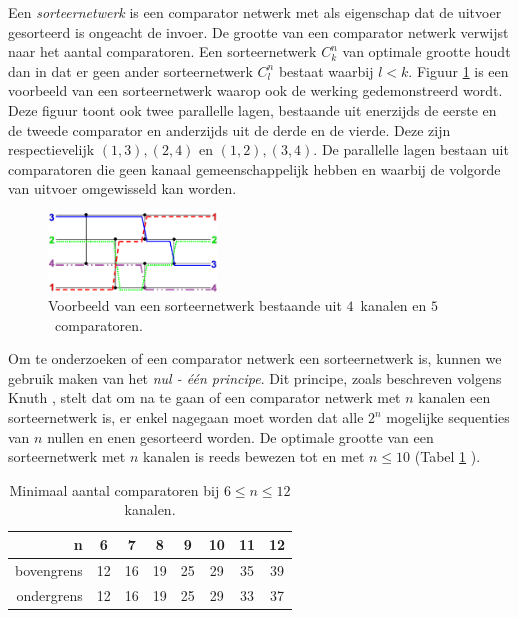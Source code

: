 \documentclass{article}
\begin{document}
Een \textit{sorteernetwerk} is een comparator netwerk met als eigenschap dat de uitvoer gesorteerd is ongeacht de invoer.
De grootte van een comparator netwerk verwijst naar het aantal comparatoren. 
Een sorteernetwerk $C^n_k$ van optimale grootte houdt dan in dat er geen ander sorteernetwerk $C^n_l$ bestaat waarbij $l < k$.
Figuur \ref{Werking} is een voorbeeld van een sorteernetwerk waarop ook de werking gedemonstreerd wordt.
Deze figuur toont ook twee parallelle lagen, bestaande uit enerzijds de eerste en de tweede comparator en anderzijds uit de derde en de vierde.
Deze zijn respectievelijk $(1,3), (2,4)$ en $(1,2), (3,4)$.
De parallelle lagen bestaan uit comparatoren die geen kanaal gemeenschappelijk hebben en waarbij de volgorde van uitvoer omgewisseld kan worden.
\begin{figure}[!h]
	\centering
	\includegraphics[width=0.4\textwidth]{NetworkTransparent.png} 
	\caption{Voorbeeld van een sorteernetwerk bestaande uit $4$~kanalen en $5$~comparatoren.}
	\label{Werking}
\end{figure}

Om te onderzoeken of een comparator netwerk een sorteernetwerk is, kunnen we gebruik maken van het \textit{nul - \'e\'en principe}. 
Dit principe, zoals beschreven volgens Knuth \cite{Knuth3}, stelt dat om na te gaan of een comparator netwerk met $n$ kanalen een sorteernetwerk is, er enkel nagegaan moet worden dat alle $2^n$ mogelijke sequenties van $n$ nullen en enen gesorteerd worden.
De optimale grootte van een sorteernetwerk met $n$ kanalen is reeds bewezen tot en met $n \leq 10$ (Tabel \ref{tabel1} \cite{sortingNetworksSize2014}).
\begin{table}[h!]
	\centering
	\begin{tabular}{r|c|c|c|c|c|c|c}
	n & 6 & 7 & 8 & 9 & 10 & 11 & 12\\ 
	\hline 
	bovengrens & 12 & 16 & 19 & 25 & 29 & 35 & 39\\ 
	\hline 
	ondergrens & 12 & 16 & 19 & 25& 29 & 33 & 37\\
	\end{tabular} 
	\caption{Minimaal aantal comparatoren bij $6 \leq n \leq 12$ kanalen.}
	\label{tabel1}
\end{table}
\end{document}
